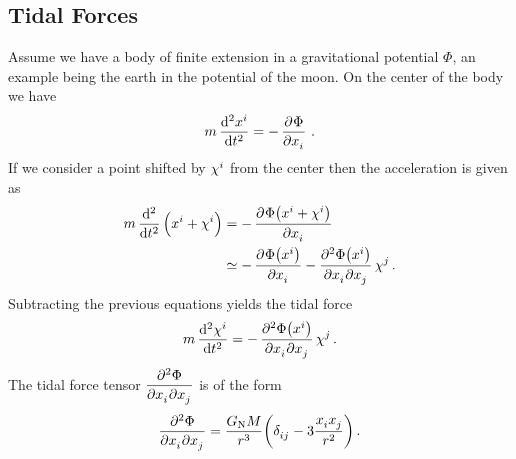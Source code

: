 \subsection{Tidal Forces}
Assume we have a body of finite extension in a gravitational
potential $\Phi$, an example being the earth in the potential of the moon.
On the center of the body we have 
\begin{equation}
m \dod[2]{\tensor{x}{^i}}{t}=-\dpd{\Phi}{\tensor{x}{_i}}\,.
\end{equation}
If we consider a point shifted by $\tensor{\chi}{^i}$ from the center then the
acceleration is given as
\begin{equation}
\begin{split}
m \dod[2]{}{t}\left(\tensor{x}{^i}+\tensor{\chi}{^i}\right)
&=-\dpd{\Phi\left(\tensor{x}{^i}+\tensor{\chi}{^i}\right)}{\tensor{x}{_i}}\\
&\simeq-\dpd{\Phi\left(\tensor{x}{^i}\right)}{\tensor{x}{_i}}
-\dmd{\Phi\left(\tensor{x}{^i}\right)}{2}{\tensor{x}{_i}}{}{\tensor{x}{_j}}{}\tensor{\chi}{^j}\,.
\end{split}
\end{equation}
Subtracting the previous equations yields the tidal force
\begin{equation}
m \dod[2]{\tensor{\chi}{^i}}{t}=-\dmd{\Phi\left(\tensor{x}{^i}\right)}{2}{\tensor{x}{_i}}{}{\tensor{x}{_j}}{}\tensor{\chi}{^j}\,.
\end{equation}
The tidal force tensor $\dmd{\Phi}{2}{\tensor{x}{_i}}{}{\tensor{x}{_j}}{}$ is of
the form
\begin{equation}
\dmd{\Phi}{2}{\tensor{x}{_i}}{}{\tensor{x}{_j}}{}
=\frac{G\textsubscript{N}M}{r^3}\left(\tensor{\delta}{_i_j}-3\frac{\tensor{x}{_i}\tensor{x}{_j}}{r^2}\right)\,.
\end{equation}
